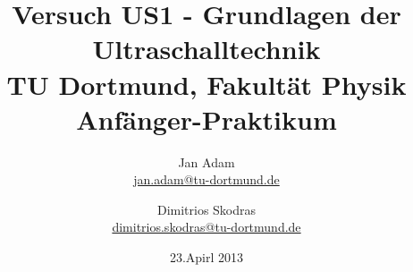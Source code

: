 



\title{Versuch US1 - Grundlagen der Ultraschalltechnik\\				%
\large TU Dortmund, Fakultät Physik\\ 
\normalsize Anfänger-Praktikum}

\author{Jan Adam\\			%
{\small \href{jan.adam@tu-dortmund.de}{jan.adam@tu-dortmund.de}}	%
\and						%
Dimitrios Skodras\\					%
{\small \href{dimitrios.skodras@tu-dortmund.de}{dimitrios.skodras@tu-dortmund.de}}		%
}
\date{23.Apirl 2013}				%





\maketitle					%
\thispagestyle{empty} 				%



\tableofcontents


\newpage					%



